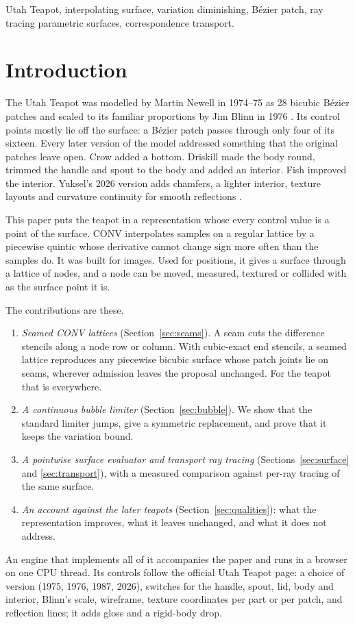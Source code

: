 \documentclass[journal]{IEEEtran}
\begin{document}
\begin{IEEEkeywords}
Utah Teapot, interpolating surface, variation diminishing, B\'ezier patch,
ray tracing parametric surfaces, correspondence transport.
\end{IEEEkeywords}

\section{Introduction}

The Utah Teapot was modelled by Martin Newell in 1974--75 as 28 bicubic
B\'ezier patches and scaled to its familiar proportions by Jim Blinn in
1976 \cite{newell1975,blinnnewell1976,crow1987,blinn1987}. Its control
points mostly lie off the surface: a B\'ezier patch passes through only
four of its sixteen. Every later version of the model addressed something
that the original patches leave open. Crow added a bottom. Driskill made
the body round, trimmed the handle and spout to the body and added an
interior. Fish improved the interior. Yuksel's 2026 version adds chamfers,
a lighter interior, texture layouts and curvature continuity for smooth
reflections \cite{utahpage,yuksel2026}.

This paper puts the teapot in a representation whose every control
value is a point of the surface.
CONV \cite{convpaper} interpolates samples on a regular lattice by a
piecewise quintic whose derivative cannot change sign more often than the
samples do. It was built for images. Used for positions, it gives a surface
through a lattice of nodes, and a node can be moved, measured, textured or
collided with as the surface point it is.

The contributions are these.
\begin{enumerate}
\item \emph{Seamed CONV lattices} (Section~\ref{sec:seams}). A seam cuts
the difference stencils along a node row or column. With cubic-exact
end stencils, a seamed lattice reproduces any piecewise bicubic surface
whose patch joints lie on seams, wherever admission leaves the proposal
unchanged. For the teapot that is everywhere.
\item \emph{A continuous bubble limiter} (Section~\ref{sec:bubble}). We
show that the standard limiter jumps, give a symmetric replacement, and
prove that it keeps the variation bound.
\item \emph{A pointwise surface evaluator and transport ray tracing}
(Sections~\ref{sec:surface} and \ref{sec:transport}), with a measured
comparison against per-ray tracing of the same surface.
\item \emph{An account against the later teapots}
(Section~\ref{sec:qualities}): what the representation improves, what it
leaves unchanged, and what it does not address.
\end{enumerate}
An engine that implements all of it accompanies the paper and runs in a
browser on one CPU thread. Its controls follow the official Utah Teapot
page: a choice of version (1975, 1976, 1987, 2026), switches for the
handle, spout, lid, body and interior, Blinn's scale, wireframe, texture
coordinates per part or per patch, and reflection lines; it adds gloss
and a rigid-body drop.
\end{document}
